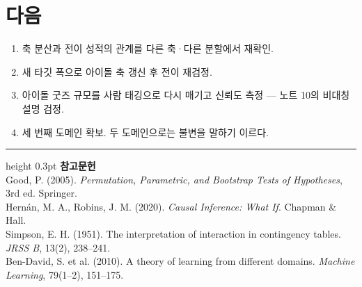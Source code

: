 \documentclass[10pt]{article}
\begin{document}
\section{다음}

\begin{enumerate}[leftmargin=1.3em,itemsep=0.15em]
\item 축 분산과 전이 성적의 관계를 다른 축·다른 분할에서 재확인.
\item 새 타깃 폭으로 아이돌 축 갱신 후 전이 재검정.
\item 아이돌 굿즈 규모를 사람 태깅으로 다시 매기고 신뢰도 측정 --- 노트 10의
      비대칭 설명 검정.
\item 세 번째 도메인 확보. 두 도메인으로는 불변을 말하기 이르다.
\end{enumerate}

\vspace{0.6em}
\hrule height 0.3pt
\vspace{0.5em}
{\footnotesize
\textbf{참고문헌}\\[0.3em]
Good, P. (2005). \emph{Permutation, Parametric, and Bootstrap Tests of Hypotheses},
3rd ed. Springer.\\[0.15em]
Hernán, M. A., Robins, J. M. (2020). \emph{Causal Inference: What If}.
Chapman \& Hall.\\[0.15em]
Simpson, E. H. (1951). The interpretation of interaction in contingency tables.
\emph{JRSS B}, 13(2), 238--241.\\[0.15em]
Ben-David, S. et al. (2010). A theory of learning from different domains.
\emph{Machine Learning}, 79(1--2), 151--175.
}
\end{document}
